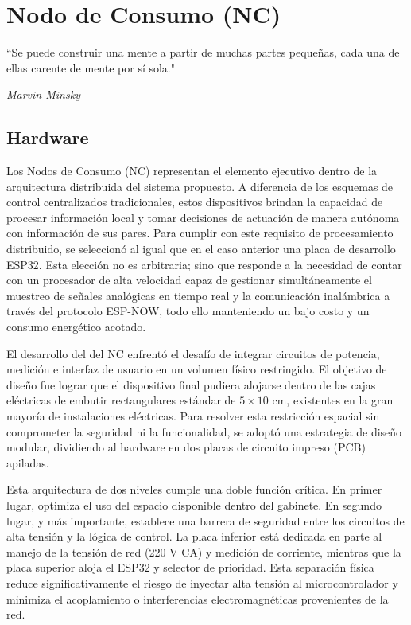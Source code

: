 \cleardoublepage
\chapter{Nodo de Consumo (NC)}
\epigraph{``Se puede construir una mente a partir de muchas partes pequeñas,
cada una de ellas carente de mente por sí sola."}{\textit{Marvin Minsky}}
\section{Hardware}

Los Nodos de Consumo (NC) representan el elemento ejecutivo dentro de la arquitectura distribuida del sistema propuesto. A diferencia de los esquemas de control centralizados tradicionales, estos dispositivos brindan la capacidad de procesar información local y tomar decisiones de actuación de manera autónoma con información de sus pares. Para cumplir con este requisito de procesamiento distribuido, se seleccionó al igual que en el caso anterior una placa de desarrollo ESP32. Esta elección no es arbitraria; sino que responde a la necesidad de contar con un procesador de alta velocidad capaz de gestionar simultáneamente el muestreo de señales analógicas en tiempo real y la comunicación inalámbrica a través del protocolo ESP-NOW, todo ello manteniendo un bajo costo y un consumo energético acotado.

El desarrollo del  del NC enfrentó el desafío de integrar circuitos de potencia, medición e interfaz de usuario en un volumen físico restringido. El objetivo de diseño fue lograr que el dispositivo final pudiera alojarse dentro de las cajas eléctricas de embutir rectangulares estándar de $5 \times 10$ cm, existentes en la gran mayoría de instalaciones eléctricas. Para resolver esta restricción espacial sin comprometer la seguridad ni la funcionalidad, se adoptó una estrategia de diseño modular, dividiendo al hardware en dos placas de circuito impreso (PCB) apiladas.

Esta arquitectura de dos niveles cumple una doble función crítica. En primer lugar, optimiza el uso del espacio disponible dentro del gabinete. En segundo lugar, y más importante, establece una barrera de seguridad entre los circuitos de alta tensión y la lógica de control. La placa inferior está dedicada en parte al manejo de la tensión de red (220 V CA) y medición de corriente, mientras que la placa superior aloja el ESP32 y selector de prioridad. Esta separación física reduce significativamente el riesgo de inyectar alta tensión al microcontrolador y minimiza el acoplamiento o interferencias electromagnéticas provenientes de la red.

